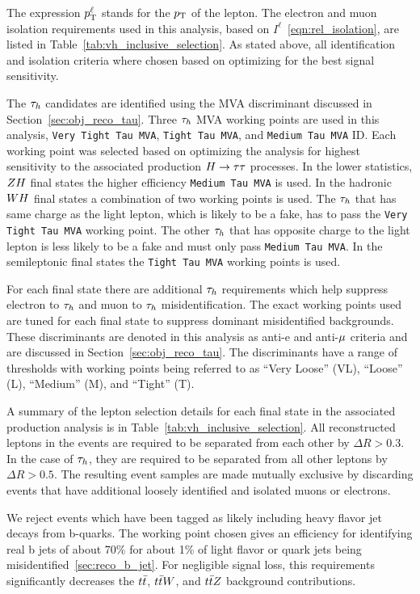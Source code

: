 The expression $p_\mathrm{T}^{\ell}$ stands for the $p_\mathrm{T}$ of the lepton. The electron and muon isolation 
requirements used in this analysis, based on $I^{\ell}$~\ref{eqn:rel_isolation}, 
are listed in Table~\ref{tab:vh_inclusive_selection}. As stated above, all 
identification and isolation criteria where chosen based on optimizing for the best signal sensitivity.

The $\tau_{h}$ candidates are identified using the MVA discriminant discussed in
Section~\ref{sec:obj_reco_tau}.
Three $\tau_{h}$ MVA working points are used in this analysis,
\texttt{Very Tight Tau MVA}, \texttt{Tight Tau MVA}, and \texttt{Medium Tau MVA} ID. Each working point was selected based on
optimizing the analysis for highest sensitivity to the associated production
$H\to\tau\tau$ processes. In the lower statistics, $ZH$ final states the higher
efficiency \texttt{Medium Tau MVA} is used. In the hadronic $WH$ final states
a combination of two working points is used. The 
$\tau_{h}$ that has same charge as the light lepton, which 
is likely to be a fake, has to pass the \texttt{Very Tight Tau MVA} working 
point. The other $\tau_{h}$ that has opposite charge to the light lepton
is less likely to be a fake and must only pass \texttt{Medium Tau MVA}.
In the semileptonic final states the \texttt{Tight Tau MVA} working points
is used.

For each final state there are additional $\tau_{h}$ requirements
which help suppress electron to $\tau_{h}$ and muon to $\tau_{h}$ misidentification.
The exact working points used are tuned for each final state to suppress dominant
misidentified backgrounds. These discriminants are denoted in this analysis as
anti-e and anti-$\mu$ criteria and are discussed in Section~\ref{sec:obj_reco_tau}.
The discriminants have a range of thresholds with working points being
referred to as ``Very Loose'' (VL), ``Loose'' (L), ``Medium'' (M), and ``Tight'' (T).

A summary of the lepton selection details for each final state in the associated
production analysis is in Table~\ref{tab:vh_inclusive_selection}.
All reconstructed leptons in the events are required to be separated from each 
other by $\Delta R > 0.3$. In the case of $\tau_{h}$, they are required to be 
separated from all other leptons by $\Delta R > 0.5$. The resulting event samples are made mutually 
exclusive by discarding events that have additional loosely identified 
and isolated muons or electrons.

We reject events which have been tagged as likely including heavy flavor jet decays from b-quarks.
The working point chosen gives an efficiency for identifying real b jets of about 70\% for 
about 1\% of light flavor or quark jets being misidentified~\ref{sec:reco_b_jet}.
For negligible signal loss, this requirements significantly decreases the $t\bar{t}$,
$t\bar{t}W$, and $t\bar{t}Z$ background contributions.

